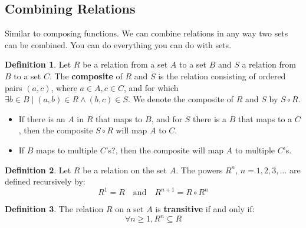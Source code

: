 \documentclass[article, 12pt]{article}
\theoremstyle{definition}
\newtheorem{definition}{Definition}[subsection]
\newcommand{\comp}{\circ} %
\begin{document}
    \subsection{Combining Relations}
    Similar to composing functions. We can combine relations in any way two sets can be combined. You can do everything you can do with sets. 
    \begin{definition}
        Let $R$ be a relation from a set $A$ to a set $B$ and $S$ a relation from $B$ to a set $C$. The \textbf{composite} of $R$ and $S$ is the relation consisting of ordered pairs $(a,c)$, where $a \in A, c \in C$, and for which $\exists b \in B \mid (a,b) \in R \land (b,c) \in S$. We denote the composite of $R$ and $S$ by $S \comp R$.
    \end{definition}
    \begin{itemize}
        \item If there is an $A$ in $R$ that maps to $B$, and for $S$ there is a $B$ that maps to a $C$, then the composite $S \comp R$ will map $A$ to $C$.
        \item If $B$ maps to multiple $C$'s?, then the composite will map $A$ to multiple $C$'s.
    \end{itemize}
    \begin{definition} \label{def:reflexive powers}
        Let $R$ be a relation on the set $A$. The powers $R^n$, $n=1,2,3,\dots$ are defined recursively by:
        \begin{equation}
            R^1 = R \quad \text{and} \quad R^{n+1} = R \comp R^n
        \end{equation}
    \end{definition}
    \begin{definition} \label{def:transitive theorem}
        The relation $R$ on a set $A$ is \textbf{transitive} if and only if: 
    \begin{equation}
        \forall n \geq 1, R^n \subseteq R 
    \end{equation}
    \end{definition}
\end{document}
